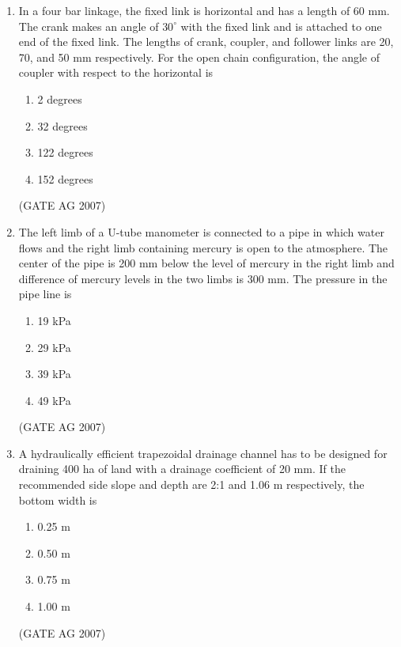 \documentclass[journal,12pt,onecolumn]{IEEEtran}
\theoremstyle{remark}
\begin{document}
\begin{enumerate}[label=Q\arabic*:]
\item In a four bar linkage, the fixed link is horizontal and has a length of 60 mm. The crank makes an angle of $30^\circ$ with the fixed link and is attached to one end of the fixed link. The lengths of crank, coupler, and follower links are 20, 70, and 50 mm respectively. For the open chain configuration, the angle of coupler with respect to the horizontal is
\begin{multicols}{4}
\begin{enumerate}
    \item 2 degrees
    \item 32 degrees
    \item 122 degrees
    \item 152 degrees
\end{enumerate}
\end{multicols}
\hfill(GATE AG 2007)

\item The left limb of a U-tube manometer is connected to a pipe in which water flows and the right limb containing mercury is open to the atmosphere. The center of the pipe is 200 mm below the level of mercury in the right limb and difference of mercury levels in the two limbs is 300 mm. The pressure in the pipe line is
\begin{multicols}{4}
\begin{enumerate}
    \item 19 kPa
    \item 29 kPa
    \item 39 kPa
    \item 49 kPa
\end{enumerate}
\end{multicols}
\hfill(GATE AG 2007)

\item A hydraulically efficient trapezoidal drainage channel has to be designed for draining 400 ha of land with a drainage coefficient of 20 mm. If the recommended side slope and depth are 2:1 and 1.06 m respectively, the bottom width is
\begin{multicols}{4}
\begin{enumerate}
    \item 0.25 m
    \item 0.50 m
    \item 0.75 m
    \item 1.00 m
\end{enumerate}
\end{multicols}
\hfill(GATE AG 2007)


\end{enumerate}
\end{document}
